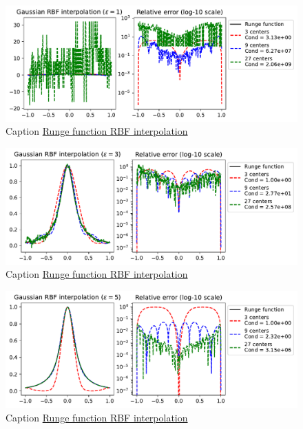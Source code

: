 \documentclass[12pt]{report} %
\begin{document}
\begin{figure}[ht]
  \centering
  \includegraphics[width=\textwidth]{imagenes/rbf_interpolation/rbf_runge_1.pdf}
  \caption{Caption \href{https://github.com/heqro/tfm-experiments/blob/main/introductory_notebooks/rbf_interpolation/runge_phs.ipynb}{Runge function RBF interpolation}}
  \label{fig:rbf-runge-phenomenon-eps-1}
\end{figure}

\begin{figure}[ht]
  \centering
  \includegraphics[width=\textwidth]{imagenes/rbf_interpolation/rbf_runge_3.pdf}
  \caption{Caption \href{https://github.com/heqro/tfm-experiments/blob/main/introductory_notebooks/rbf_interpolation/runge_phs.ipynb}{Runge function RBF interpolation}}
  \label{fig:rbf-runge-phenomenon-eps-3}
\end{figure}

\begin{figure}[ht]
  \centering
  \includegraphics[width=\textwidth]{imagenes/rbf_interpolation/rbf_runge_5.pdf}
  \caption{Caption \href{https://github.com/heqro/tfm-experiments/blob/main/introductory_notebooks/rbf_interpolation/runge_phs.ipynb}{Runge function RBF interpolation}}
  \label{fig:rbf-runge-phenomenon-eps-5}
\end{figure}
\end{document}
